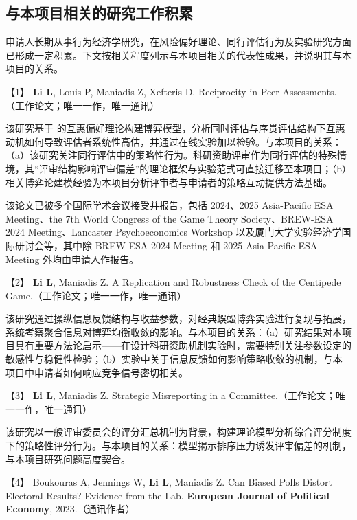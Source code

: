 \subsection{\textbf{与本项目相关的研究工作积累}}
申请人长期从事行为经济学研究，在风险偏好理论、同行评估行为及实验研究方面已形成一定积累。下文按相关程度列示与本项目相关的代表性成果，并说明其与本项目的关系。

【1】 \textbf{Li L}, Louis P, Maniadis Z, Xefteris D. Reciprocity in Peer Assessments.（工作论文；唯一一作，唯一通讯）

该研究基于 \cite{Levine1998} 的互惠偏好理论构建博弈模型，分析同时评估与序贯评估结构下互惠动机如何导致评估者系统性高估，并通过在线实验加以检验。与本项目的关系：（a）该研究关注同行评估中的策略性行为。科研资助评审作为同行评估的特殊情境，其“评审结构影响评审偏差”的理论框架与实验范式可直接迁移至本项目；（b）相关博弈论建模经验为本项目分析评审者与申请者的策略互动提供方法基础。

该论文已被多个国际学术会议接受并报告，包括 2024、2025 Asia-Pacific ESA Meeting、the 7th World Congress of the Game Theory Society、BREW-ESA 2024 Meeting、Lancaster Psychoeconomics Workshop 以及厦门大学实验经济学国际研讨会等，其中除 BREW-ESA 2024 Meeting 和 2025 Asia-Pacific ESA Meeting 外均由申请人作报告。

【2】 \textbf{Li L}, Maniadis Z. A Replication and Robustness Check of the Centipede Game.（工作论文；唯一一作，唯一通讯）

该研究通过操纵信息反馈结构与收益参数，对经典蜈蚣博弈实验进行复现与拓展，系统考察聚合信息对博弈均衡收敛的影响。与本项目的关系：（a）研究结果对本项目具有重要方法论启示——在设计科研资助机制实验时，需要特别关注参数设定的敏感性与稳健性检验；（b）实验中关于信息反馈如何影响策略收敛的机制，与本项目中申请者如何响应竞争信号密切相关。

【3】 \textbf{Li L}, Maniadis Z. Strategic Misreporting in a Committee.（工作论文；唯一一作，唯一通讯）

该研究以一般评审委员会的评分汇总机制为背景，构建理论模型分析综合评分制度下的策略性评分行为。与本项目的关系：模型揭示排序压力诱发评审偏差的机制，与本项目研究问题高度契合。

【4】 Boukouras A, Jennings W, \textbf{Li L}, Maniadis Z. Can Biased Polls Distort Electoral Results? Evidence from the Lab. \textbf{European Journal of Political Economy}, 2023.（通讯作者）

